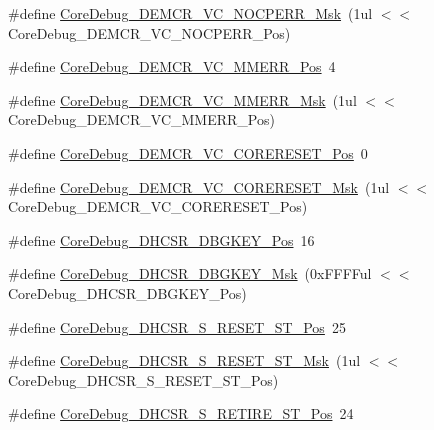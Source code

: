 \begin{DoxyCompactItemize}
\item 
\#define \hyperlink{group___c_m_s_i_s___c_m3___core_debug_ga03ee58b1b02fdbf21612809034562f1c}{Core\-Debug\-\_\-\-D\-E\-M\-C\-R\-\_\-\-V\-C\-\_\-\-N\-O\-C\-P\-E\-R\-R\-\_\-\-Msk}~(1ul $<$$<$ Core\-Debug\-\_\-\-D\-E\-M\-C\-R\-\_\-\-V\-C\-\_\-\-N\-O\-C\-P\-E\-R\-R\-\_\-\-Pos)
\item 
\#define \hyperlink{group___c_m_s_i_s___c_m3___core_debug_ga444454f7c7748e76cd76c3809c887c41}{Core\-Debug\-\_\-\-D\-E\-M\-C\-R\-\_\-\-V\-C\-\_\-\-M\-M\-E\-R\-R\-\_\-\-Pos}~4
\item 
\#define \hyperlink{group___c_m_s_i_s___c_m3___core_debug_gad420a9b60620584faaca6289e83d3a87}{Core\-Debug\-\_\-\-D\-E\-M\-C\-R\-\_\-\-V\-C\-\_\-\-M\-M\-E\-R\-R\-\_\-\-Msk}~(1ul $<$$<$ Core\-Debug\-\_\-\-D\-E\-M\-C\-R\-\_\-\-V\-C\-\_\-\-M\-M\-E\-R\-R\-\_\-\-Pos)
\item 
\#define \hyperlink{group___c_m_s_i_s___c_m3___core_debug_ga9fcf09666f7063a7303117aa32a85d5a}{Core\-Debug\-\_\-\-D\-E\-M\-C\-R\-\_\-\-V\-C\-\_\-\-C\-O\-R\-E\-R\-E\-S\-E\-T\-\_\-\-Pos}~0
\item 
\#define \hyperlink{group___c_m_s_i_s___c_m3___core_debug_ga906476e53c1e1487c30f3a1181df9e30}{Core\-Debug\-\_\-\-D\-E\-M\-C\-R\-\_\-\-V\-C\-\_\-\-C\-O\-R\-E\-R\-E\-S\-E\-T\-\_\-\-Msk}~(1ul $<$$<$ Core\-Debug\-\_\-\-D\-E\-M\-C\-R\-\_\-\-V\-C\-\_\-\-C\-O\-R\-E\-R\-E\-S\-E\-T\-\_\-\-Pos)
\item 
\#define \hyperlink{group___c_m_s_i_s___c_m3___core_debug_gac91280edd0ce932665cf75a23d11d842}{Core\-Debug\-\_\-\-D\-H\-C\-S\-R\-\_\-\-D\-B\-G\-K\-E\-Y\-\_\-\-Pos}~16
\item 
\#define \hyperlink{group___c_m_s_i_s___c_m3___core_debug_ga1ce997cee15edaafe4aed77751816ffc}{Core\-Debug\-\_\-\-D\-H\-C\-S\-R\-\_\-\-D\-B\-G\-K\-E\-Y\-\_\-\-Msk}~(0x\-F\-F\-F\-Ful $<$$<$ Core\-Debug\-\_\-\-D\-H\-C\-S\-R\-\_\-\-D\-B\-G\-K\-E\-Y\-\_\-\-Pos)
\item 
\#define \hyperlink{group___c_m_s_i_s___c_m3___core_debug_ga6f934c5427ea057394268e541fa97753}{Core\-Debug\-\_\-\-D\-H\-C\-S\-R\-\_\-\-S\-\_\-\-R\-E\-S\-E\-T\-\_\-\-S\-T\-\_\-\-Pos}~25
\item 
\#define \hyperlink{group___c_m_s_i_s___c_m3___core_debug_gac474394bcceb31a8e09566c90b3f8922}{Core\-Debug\-\_\-\-D\-H\-C\-S\-R\-\_\-\-S\-\_\-\-R\-E\-S\-E\-T\-\_\-\-S\-T\-\_\-\-Msk}~(1ul $<$$<$ Core\-Debug\-\_\-\-D\-H\-C\-S\-R\-\_\-\-S\-\_\-\-R\-E\-S\-E\-T\-\_\-\-S\-T\-\_\-\-Pos)
\item 
\#define \hyperlink{group___c_m_s_i_s___c_m3___core_debug_ga2328118f8b3574c871a53605eb17e730}{Core\-Debug\-\_\-\-D\-H\-C\-S\-R\-\_\-\-S\-\_\-\-R\-E\-T\-I\-R\-E\-\_\-\-S\-T\-\_\-\-Pos}~24
$$
\end{DoxyCompactItemize}
